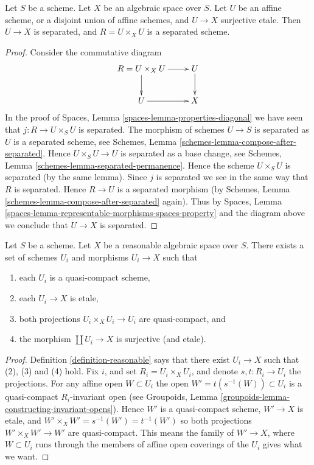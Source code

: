 \begin{lemma}
\label{lemma-algebraic-space-affine-cover}
Let $S$ be a scheme.
Let $X$ be an algebraic space over $S$.
Let $U$ be an affine scheme, or a disjoint union of affine schemes,
and $U \to X$ surjective etale.
Then $U \to X$ is separated, and $R = U \times_X U$ is a separated scheme.
\end{lemma}

\begin{proof}
Consider the commutative diagram
$$
\xymatrix{
R = U \times_X U \ar[r] \ar[d] & U \ar[d] \\
U \ar[r] & X
}
$$
In the proof of Spaces, Lemma \ref{spaces-lemma-properties-diagonal}
we have seen that $j : R \to U \times_S U$ is separated.
The morphism of schemes $U \to S$ is separated as $U$ is a separated
scheme, see 
Schemes, Lemma \ref{schemes-lemma-compose-after-separated}.
Hence $U \times_S U \to U$ is separated as a base change, see
Schemes, Lemma \ref{schemes-lemma-separated-permanence}.
Hence the scheme $U \times_S U$ is separated (by the same lemma).
Since $j$ is separated we see in the same way that $R$ is separated.
Hence $R \to U$ is a separated morphism (by
Schemes, Lemma \ref{schemes-lemma-compose-after-separated}
again). Thus by
Spaces, Lemma \ref{spaces-lemma-representable-morphisms-spaces-property}
and the diagram above we conclude that $U \to X$ is separated.
\end{proof}

\begin{lemma}
\label{lemma-reasonable-quasi-compact-pieces}
Let $S$ be a scheme.
Let $X$ be a reasonable algebraic space over $S$.
There exists a set of schemes
$U_i$ and morphisms $U_i \to X$ such that
\begin{enumerate}
\item each $U_i$ is a quasi-compact scheme,
\item each $U_i \to X$ is etale,
\item both projections $U_i \times_X U_i \to U_i$ are quasi-compact, and
\item the morphism $\coprod U_i \to X$ is surjective (and etale).
\end{enumerate}
\end{lemma}

\begin{proof}
Definition \ref{definition-reasonable}
says that there exist $U_i \to X$ such that (2), (3) and (4) hold.
Fix $i$, and set $R_i = U_i \times_X U_i$, and denote $s, t : R_i \to U_i$
the projections.
For any affine open $W \subset U_i$ the open $W' = t(s^{-1}(W)) \subset U_i$
is a quasi-compact $R_i$-invariant open (see
Groupoids, Lemma \ref{groupoids-lemma-constructing-invariant-opens}).
Hence $W'$ is a quasi-compact scheme, $W' \to X$ is etale, and
$W' \times_X W' = s^{-1}(W') = t^{-1}(W')$ so both projections
$W' \times_X W' \to W'$ are quasi-compact. This means the family of
$W' \to X$, where $W \subset U_i$ runs through the members of affine
open coverings of the $U_i$ gives what we want.
\end{proof}

